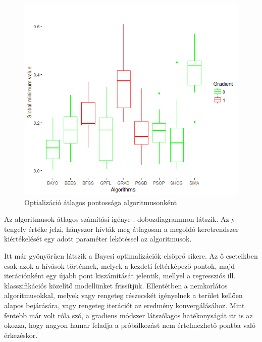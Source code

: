 \begin{figure}
	\centering
	\includegraphics[width=140mm, keepaspectratio]{figures/gradiens_pontossag_boxplot.png}
	\caption{Optializáció átlagos pontossága algoritmusonként}
	\label{fig:derivaltak}
\end{figure}

Az algoritmusok átlagos számítási igénye . dobozdiagrammon látszik. Az y tengely értéke jelzi, hányszor hívták meg átlagosan a megoldó keretrendszer kiértékelését egy adott paraméter lekötéssel az algoritmusok.

Itt már gyönyörűen látszik a Bayesi optimalizációk elsöprő sikere. Az ő eseteikben csak azok a hívások történnek, melyek a kezdeti feltérképező pontok, majd iterációnként egy újabb pont kiszámítását jelentik, mellyel a regressziós ill. klasszifikációs közelítő modellünket frissítjük. Ellentétben a nemkorlátos algoritmusokkal, melyek vagy rengeteg részecskét igényelnek a terület kellően alapos bejárására, vagy rengeteg iterációt az eredmény konvergálásához. Mint fentebb már volt róla szó, a gradiens módszer látszólagos hatékonyságát itt is az okozza, hogy nagyon hamar feladja a próbálkozást nem értelmezhető pontba való érkezéskor.

